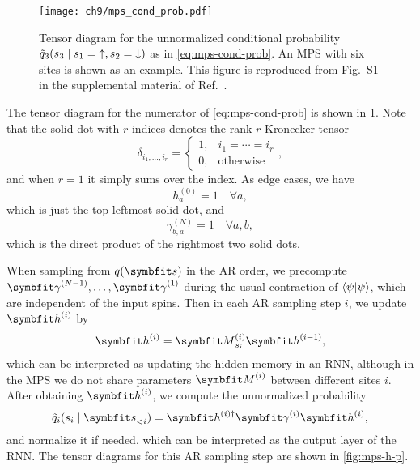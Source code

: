 \begin{figure}[htb]
\centering
\texttt{[image: ch9/mps\_cond\_prob.pdf]}
\caption[Tensor diagram for conditional probability in MPS]{
Tensor diagram for the unnormalized conditional probability $\tilde{q}_3(s_3 \mid s_1 = {\uparrow}, s_2 = {\downarrow})$ as in \cref{eq:mps-cond-prob}. An MPS with six sites is shown as an example.
This figure is reproduced from Fig.~S1 in the supplemental material of Ref.~\cite{wu2023tensor}.
}
\label{fig:mps-cond-prob}
\end{figure}

The tensor diagram for the numerator of \cref{eq:mps-cond-prob} is shown in \cref{fig:mps-cond-prob}. Note that the solid dot with $r$ indices denotes the rank-$r$ Kronecker tensor
\begin{equation}
\delta_{i_1, \ldots, i_r} = \begin{cases}
1, & i_1 = \cdots = i_r \\
0, & \text{otherwise}
\end{cases},
\end{equation}
and when $r = 1$ it simply sums over the index. As edge cases, we have
\begin{equation}
h^{(0)}_a = 1 \quad \forall a,
\end{equation}
which is just the top leftmost solid dot, and
\begin{equation}
\gamma^{(N)}_{b, a} = 1 \quad \forall a, b,
\end{equation}
which is the direct product of the rightmost two solid dots.

When sampling from $q(\vs)$ in the AR order, we precompute $\mga^{(N - 1)}, \ldots, \mga^{(1)}$ during the usual contraction of $\ip{\psi}$, which are independent of the input spins. Then in each AR sampling step $i$, we update $\vh^{(i)}$ by
\begin{equation}
\vh^{(i)} = \mM^{(i)}_{s_i} \vh^{(i - 1)},
\label{eq:mps-rnn-h}
\end{equation}
which can be interpreted as updating the hidden memory in an RNN, although in the MPS we do not share parameters $\mM^{(i)}$ between different sites $i$. After obtaining $\vh^{(i)}$, we compute the unnormalized probability
\begin{equation}
\tilde{q}_i(s_i \mid \vs_{< i}) = \vh^{(i) \dagger} \mga^{(i)} \vh^{(i)},
\label{eq:mps-rnn-q}
\end{equation}
and normalize it if needed, which can be interpreted as the output layer of the RNN. The tensor diagrams for this AR sampling step are shown in \cref{fig:mps-h-p}.

